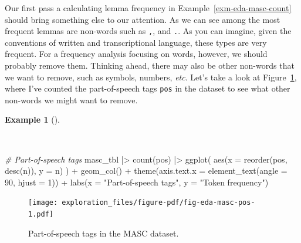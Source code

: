 \documentclass[
  letterpaper,
  DIV=11,
  numbers=noendperiod]{scrreport}
\newenvironment{Shaded}{\begin{snugshade}}{\end{snugshade}}
\newcommand{\AttributeTok}[1]{\textcolor[rgb]{0.00,0.00,0.00}{#1}}
\newcommand{\CommentTok}[1]{\textcolor[rgb]{0.00,0.00,0.00}{\textit{#1}}}
\newcommand{\DecValTok}[1]{\textcolor[rgb]{0.00,0.00,0.00}{#1}}
\newcommand{\FunctionTok}[1]{\textcolor[rgb]{0.00,0.00,0.00}{#1}}
\newcommand{\NormalTok}[1]{\textcolor[rgb]{0.00,0.00,0.00}{#1}}
\newcommand{\SpecialCharTok}[1]{\textcolor[rgb]{0.00,0.00,0.00}{#1}}
\newcommand{\StringTok}[1]{\textcolor[rgb]{0.00,0.00,0.00}{#1}}
\theoremstyle{definition}
\newtheorem{example}{Example}[chapter]
\theoremstyle{remark}
\begin{document}
Our first pass a calculating lemma frequency in
Example~\ref{exm-eda-masc-count} should bring something else to our
attention. As we can see among the most frequent lemmas are non-words
such as \texttt{,}, and \texttt{.}. As you can imagine, given the
conventions of written and transcriptional language, these types are
very frequent. For a frequency analysis focusing on words, however, we
should probably remove them. Thinking ahead, there may also be other
non-words that we want to remove, such as symbols, numbers, \emph{etc}.
Let's take a look at Figure~\ref{fig-eda-masc-pos}, where I've counted
the part-of-speech tags \texttt{pos} in the dataset to see what other
non-words we might want to remove.

\begin{example}[]\protect\hypertarget{exm-eda-masc-pos}{}\label{exm-eda-masc-pos}

~

\begin{Shaded}
\begin{Highlighting}[]
\CommentTok{\# Part{-}of{-}speech tags}
\NormalTok{masc\_tbl }\SpecialCharTok{|\textgreater{}} 
  \FunctionTok{count}\NormalTok{(pos) }\SpecialCharTok{|\textgreater{}} 
  \FunctionTok{ggplot}\NormalTok{(}
    \FunctionTok{aes}\NormalTok{(}\AttributeTok{x =} \FunctionTok{reorder}\NormalTok{(pos, }\FunctionTok{desc}\NormalTok{(n)), }\AttributeTok{y =}\NormalTok{ n)}
\NormalTok{    ) }\SpecialCharTok{+}
  \FunctionTok{geom\_col}\NormalTok{() }\SpecialCharTok{+}
  \FunctionTok{theme}\NormalTok{(}\AttributeTok{axis.text.x =} \FunctionTok{element\_text}\NormalTok{(}\AttributeTok{angle =} \DecValTok{90}\NormalTok{, }\AttributeTok{hjust =} \DecValTok{1}\NormalTok{)) }\SpecialCharTok{+} 
  \FunctionTok{labs}\NormalTok{(}\AttributeTok{x =} \StringTok{"Part{-}of{-}speech tags"}\NormalTok{, }\AttributeTok{y =} \StringTok{"Token frequency"}\NormalTok{)}
\end{Highlighting}
\end{Shaded}

\begin{figure}[H]

{\centering \texttt{[image: exploration\_files/figure-pdf/fig-eda-masc-pos-1.pdf]}

}

\caption{\label{fig-eda-masc-pos}Part-of-speech tags in the MASC
dataset.}

\end{figure}

\end{example}
\end{document}
